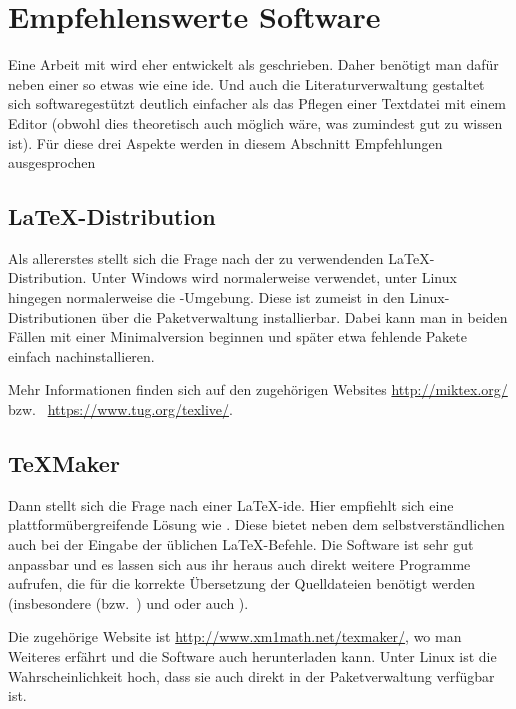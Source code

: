 \section{Empfehlenswerte Software}
\label{sec:Software}
%
Eine Arbeit mit \LaTeXe{} wird eher entwickelt als geschrieben. Daher benötigt man dafür neben einer 
 so etwas wie eine \gls{ide}. Und auch die Literaturverwaltung gestaltet 
sich softwaregestützt deutlich einfacher als das Pflegen einer Textdatei mit einem Editor (obwohl 
dies theoretisch auch möglich wäre, was zumindest gut zu wissen ist). Für diese drei Aspekte
werden in diesem Abschnitt Empfehlungen ausgesprochen

%
\subsection{\LaTeX{}-Distribution}
\label{subsec:distribution}
%
Als allererstes stellt sich die Frage nach der zu verwendenden \LaTeX{}-Distribution. Unter Windows wird normalerweise
 verwendet, unter Linux hingegen normalerweise die -Umgebung. Diese ist zumeist in den 
Linux-Distributionen über die Paketverwaltung installierbar. Dabei kann man in beiden Fällen mit einer Minimalversion
beginnen und später etwa fehlende Pakete einfach nachinstallieren.

Mehr Informationen finden sich auf den zugehörigen Websites \url{http://miktex.org/} 
bzw.~ \url{https://www.tug.org/texlive/}.
%
\subsection{TeXMaker}
\label{subsec:texmaker}
%
Dann stellt sich die Frage nach einer \LaTeX{}-\gls{ide}. Hier empfiehlt sich eine 
%
%
platt\-form\-über\-grei\-fen\-de
%
Lösung wie . Diese bietet neben dem selbstverständlichen 
auch  bei der Eingabe der üblichen \LaTeX{}-Befehle. Die Software ist
sehr gut anpassbar und es lassen sich aus ihr heraus auch direkt weitere Programme aufrufen, die für die
korrekte Übersetzung der Quelldateien benötigt werden (insbesondere  (bzw.~)
und  oder auch ).

Die zugehörige Website ist \url{http://www.xm1math.net/texmaker/}, wo man Weiteres erfährt und die Software
auch herunterladen kann. Unter Linux ist die Wahrscheinlichkeit hoch, dass sie auch direkt in der
Paketverwaltung verfügbar ist.
%
